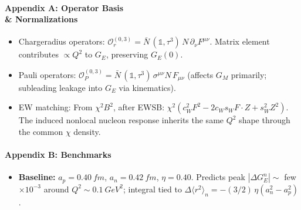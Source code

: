 \documentclass[11pt]{article}
\newcommand{\GE}{G_E}
\newcommand{\GN}{G_E^n}
\begin{document}
\paragraph{Appendix A: Operator Basis \\& Normalizations}
\begin{itemize}
  \item Charge\mbox{\textendash}radius operators: $\mathcal{O}_r^{(0,3)}=\bar N\,(\mathbb 1,\tau^3)\,N\,\partial_\nu F^{\mu\nu}$. Matrix element contributes $\propto Q^2$ to $\GE$, preserving $\GE(0)$.
  \item Pauli operators: $\mathcal{O}_P^{(0,3)}=\bar N\,(\mathbb 1,\tau^3)\,\sigma^{\mu\nu}N\,F_{\mu\nu}$ (affects $G_M$ primarily; subleading leakage into $\GE$ via kinematics).
  \item EW matching: From $\chi^2 B^2$, after EWSB: $\chi^2(c_W^2 F^2-2c_W s_W F\!\cdot\!Z+s_W^2 Z^2)$. The induced non\mbox{\textendash}local nucleon response inherits the same $Q^2$ shape through the common $\chi$ density.
\end{itemize}

\paragraph{Appendix B: Benchmarks}
\begin{itemize}
  \item \textbf{Baseline:} $a_p=\SI{0.40}{fm}$, $a_n=\SI{0.42}{fm}$, $\eta=0.40$. Predicts peak $|\Delta \GN|\sim$ few $\times 10^{-3}$ around $Q^2\sim\SI{0.1}{GeV^2}$; integral tied to $\Delta\langle r^2\rangle_n=-(3/2)\,\eta(a_n^2-a_p^2)$.
\end{itemize}

\nocite{*}


\end{document}
